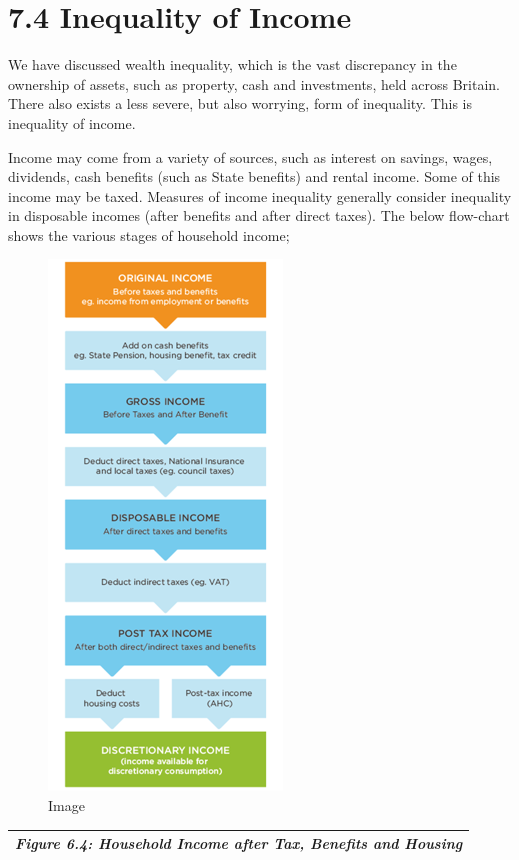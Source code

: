 \documentclass[]{tufte-handout}
\begin{document}
\hypertarget{inequality-of-income}{%
\section{7.4 Inequality of Income}\label{inequality-of-income}}

We have discussed wealth inequality, which is the vast discrepancy in
the ownership of assets, such as property, cash and investments, held
across Britain. There also exists a less severe, but also worrying, form
of inequality. This is inequality of income.

Income may come from a variety of sources, such as interest on savings,
wages, dividends, cash benefits (such as State benefits) and rental
income. Some of this income may be taxed. Measures of income inequality
generally consider inequality in disposable incomes (after benefits and
after direct taxes). The below flow-chart shows the various stages of
household income;

\begin{figure}
\centering
\includegraphics{OtherPictures/IncomeAfterTaxes2.png}
\caption{Image}
\end{figure}

\begin{longtable}[]{@{}c@{}}
\toprule
\endhead
\emph{Figure 6.4: Household Income after Tax, Benefits and
Housing}\tabularnewline
\bottomrule
\end{longtable}
\end{document}

